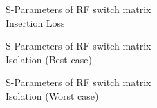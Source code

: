 \documentclass[12pt,openany,a4paper]{book}
\begin{document}
\begin{figure}[H]
	\centering
	\caption{S-Parameters of RF switch matrix \\ Insertion Loss}
	\label{fig:rf_sparam1}
\end{figure} 





\begin{figure}[H]
	\centering
	\caption{S-Parameters of RF switch matrix\\ Isolation (Best case)}
	\label{fig:rf_sparam2}
\end{figure} 





\begin{figure}[H]
	\centering
	\caption{S-Parameters of RF switch matrix\\ Isolation (Worst case)}
	\label{fig:rf_sparam3}
\end{figure} 



\end{document}

